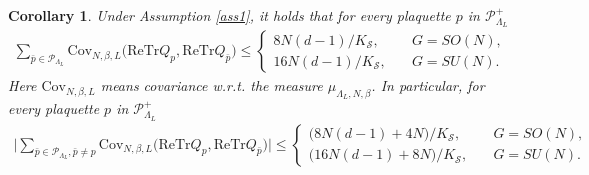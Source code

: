 \documentclass[11pt,UTF-8,reqno]{amsart}
\numberwithin{equation}{section}
\newtheorem{corollary}[theorem]{Corollary}
\def\cov{{\mathrm{Cov}}}
\def\cS{{\mathcal S}}
\def\leq{\leqslant}
\def\bc{\begin{corollary}}
\def\ec{\end{corollary}}
\def\leq{\leqslant}
\begin{document}
\bc \label{co:cc}
Under Assumption \ref{ass1}, it holds that for  every plaquette $p$ in $\mathcal{P}^+_{\Lambda_{L}}$
\begin{align*}
	\sum_{\bar p\in \mathcal{P}_{\Lambda_L}} \cov_{N,\beta,L}\Big(\mathrm{ReTr}Q_p,\mathrm{ReTr} Q_{\bar p}\Big)\leq \begin{cases}
		8N(d-1) / K_\cS ,&\quad G= SO(N),\\
		16N(d-1) / K_\cS ,&\quad G=SU(N).
	\end{cases}
\end{align*}
Here $\cov_{N,\beta,L}$ means covariance w.r.t. the measure $\mu_{\Lambda_L,N,\beta}$. In particular,
for  every plaquette $p$ in $\mathcal{P}^+_{\Lambda_{L}}$
\begin{align*}
	\Big|\sum_{\bar p\in \mathcal{P}_{\Lambda_L},\bar p\neq p} \cov_{N,\beta,L}\Big(\mathrm{ReTr}Q_p,\mathrm{ReTr} Q_{\bar p}\Big)\Big|\leq \begin{cases}
		\big(8N(d-1)+4N\big) / K_\cS ,&\quad G= SO(N),\\
		\big(16N(d-1)+8N \big)/ K_\cS,&\quad G=SU(N).
	\end{cases}
\end{align*}
\ec
\end{document}
